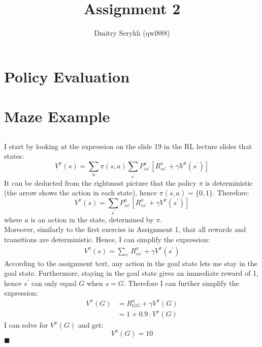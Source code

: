 \documentclass[a4paper]{article}
\title{\vspace{-5cm} Assignment 2}
\author{Dmitry Serykh (qwl888)}
\newcommand*{\QEDA}{\hfill\ensuremath{\blacksquare}}%
\begin{document}
\maketitle

\section{Policy Evaluation}
\label{sec:1}

\section{Maze Example}
\label{sec:2}
\subsection{}
\label{subsec:21}
I start by looking at the expression on the slide 19 in the RL lecture slides that states:
\[
V^{\pi}(s)
=\sum_{a} \pi(s, a) \sum_{s^{\prime}} P_{s s^{\prime}}^{a}
\left[R_{s s^{\prime}}^{a}+\gamma V^{\pi}\left(s^{\prime}\right)\right]
\]
It can be deducted from the rightmost picture that the policy $\pi$ is
deterministic (the arrow shows the action in each state), hence
$\pi(s,a) = \{0,1\}$. Therefore:
\[
V^{\pi}(s) =\sum_{s^{\prime}} P_{s s^{\prime}}^{a}
\left[R_{s s^{\prime}}^{a}+\gamma V^{\pi}\left(s^{\prime}\right)\right]
\]
where $a$ is an action in the state, determined by $\pi$.\\
Moreover, similarly to the first exercise in Assignment 1, that all rewards and
transitions are deterministic. Hence, I can simplify the expression:
\begin{align}
  \label{V_pi}
  V^{\pi}(s) = \sum_{s^{\prime}} R_{s s^{\prime}}^{a}+\gamma V^{\pi}\left(s^{\prime}\right)
\end{align}
According to the assignment text, any action in the goal state lets me stay in
the goal state. Furthermore, staying in the goal state gives an immediate reward of 1,
hence $s^{\prime}$ can only equal $G$ when $s = G$. Therefore I can further simplify
the expression:
\begin{align*}
  V^{\pi}(G) &= R_{G G}^{a}+\gamma V^{\pi}\left(G\right) \\
  &= 1 + 0.9 \cdot V^{\pi}(G)
\end{align*}
I can solve for $V^{\pi}(G)$ and get:
\[
V^{\pi}(G) = 10
\]
\QEDA
\end{document}
